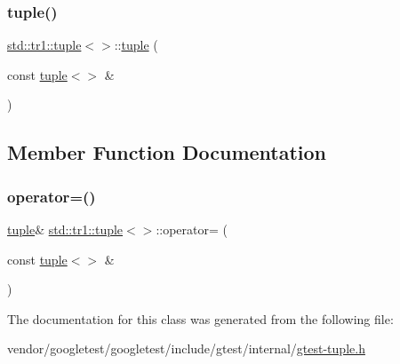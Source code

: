\mbox{\label{classstd_1_1tr1_1_1tuple_3_4_aa857599acb126134e29dc5e53fd9d1a7}} 
\subsubsection{\texorpdfstring{tuple()}{tuple()}\hspace{0.1cm}{\footnotesize\ttfamily [2/2]}}
{\footnotesize\ttfamily \hyperlink{classstd_1_1tr1_1_1tuple}{std\+::tr1\+::tuple}$<$$>$\+::\hyperlink{classstd_1_1tr1_1_1tuple}{tuple} (\begin{DoxyParamCaption}\item[{const \hyperlink{classstd_1_1tr1_1_1tuple}{tuple}$<$$>$ \&}]{ }\end{DoxyParamCaption})\hspace{0.3cm}{\ttfamily [inline]}}



\subsection{Member Function Documentation}
\mbox{\label{classstd_1_1tr1_1_1tuple_3_4_a93ddab6f662662fc49635608619150c8}} 
\subsubsection{\texorpdfstring{operator=()}{operator=()}}
{\footnotesize\ttfamily \hyperlink{classstd_1_1tr1_1_1tuple}{tuple}\& \hyperlink{classstd_1_1tr1_1_1tuple}{std\+::tr1\+::tuple}$<$$>$\+::operator= (\begin{DoxyParamCaption}\item[{const \hyperlink{classstd_1_1tr1_1_1tuple}{tuple}$<$$>$ \&}]{ }\end{DoxyParamCaption})\hspace{0.3cm}{\ttfamily [inline]}}



The documentation for this class was generated from the following file\+:\begin{DoxyCompactItemize}
\item 
vendor/googletest/googletest/include/gtest/internal/\hyperlink{gtest-tuple_8h}{gtest-\/tuple.\+h}\end{DoxyCompactItemize}
